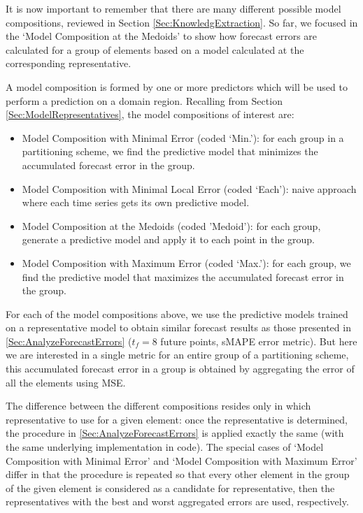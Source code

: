 It is now important to remember that there are many different possible model compositions, reviewed in Section \ref{Sec:KnowledgExtraction}. So far, we focused in the `Model Composition at the Medoids' to show how forecast errors are calculated for a group of elements based on a model calculated at the corresponding representative. 

A model composition is formed by one or more predictors which will be used to perform a prediction on a domain region. Recalling from Section \ref{Sec:ModelRepresentatives}, the model compositions of interest are:

\begin{itemize}%
	\item Model Composition with Minimal Error (coded `Min.'): for each group in a partitioning scheme, we find the predictive model that minimizes the accumulated forecast error in the group. 
	\item Model Composition with Minimal Local Error (coded `Each'): naive approach where each time series gets its own predictive model.
	\item Model Composition at the Medoids (coded 'Medoid'): for each group, generate a predictive model and apply it to each point in the group.
	\item Model Composition with Maximum Error (coded `Max.'): for each group, we find the predictive model that maximizes the accumulated forecast error in the group.
\end{itemize}

For each of the model compositions above, we use the predictive models trained on a representative model to obtain similar forecast results as those presented in \ref{Sec:AnalyzeForecastErrors} ($t_f =8$ future points, sMAPE error metric). But here we are interested in a single metric for an entire group of a partitioning scheme, this accumulated forecast error in a group is obtained by aggregating the error of all the elements using MSE.

The difference between the different compositions resides only in which representative to use for a given element: once the representative is determined, the procedure in \ref{Sec:AnalyzeForecastErrors} is applied exactly the same (with the same underlying implementation in code). The special cases of `Model Composition with Minimal Error' and `Model Composition with Maximum Error' differ in that the procedure is repeated so that every other element in the group of the given element is considered as a candidate for representative, then the representatives with the best and worst aggregated errors are used, respectively.

